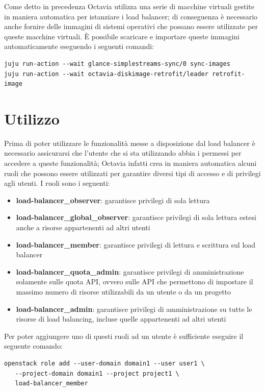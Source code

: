 Come detto in precedenza Octavia utilizza una serie di macchine virtuali gestite in maniera automatica per istanziare i load balancer; di conseguenza è necessario anche fornire delle immagini di sistemi operativi che possano essere utilizzate per queste macchine virtuali. È possibile scaricare e importare queste immagini automaticamente eseguendo i seguenti comandi:
\begin{lstlisting}[language=mybash]
juju run-action --wait glance-simplestreams-sync/0 sync-images
juju run-action --wait octavia-diskimage-retrofit/leader retrofit-image
\end{lstlisting}

\section{Utilizzo}

Prima di poter utilizzare le funzionalità messe a disposizione dal load balancer è necessario assicurarsi che l'utente che si sta utilizzando abbia i permessi per accedere a queste funzionalità; Octavia infatti crea in maniera automatica alcuni ruoli che possono essere utilizzati per garantire diversi tipi di accesso e di privilegi agli utenti. I ruoli sono i seguenti:

\begin{itemize}
    \item \textbf{load-balancer\_observer}: garantisce privilegi di sola lettura
    \item \textbf{load-balancer\_global\_observer}: garantisce privilegi di sola lettura estesi anche a risorse appartenenti ad altri utenti
    \item \textbf{load-balancer\_member}: garantisce privilegi di lettura e scrittura sul load balancer
    \item \textbf{load-balancer\_quota\_admin}: garantisce privilegi di amministrazione solamente sulle quota API, ovvero sulle API che permettono di impostare il massimo numero di risorse utilizzabili da un utente o da un progetto
    \item \textbf{load-balancer\_admin}: garantisce privilegi di amministrazione su tutte le risorse di load balancing, incluse quelle appartenenti ad altri utenti
\end{itemize}

Per poter aggiungere uno di questi ruoli ad un utente è sufficiente eseguire il seguente comando:
\begin{lstlisting}[language=mybash]
openstack role add --user-domain domain1 --user user1 \
   --project-domain domain1 --project project1 \
   load-balancer_member
\end{lstlisting}

